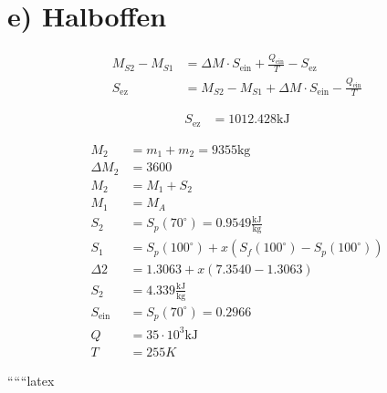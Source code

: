 \section*{e) Halboffen}

\begin{align*}
    M_{S2} - M_{S1} &= \Delta M \cdot S_{\text{ein}} + \frac{Q_{\text{ein}}}{T} - S_{\text{ez}} \\
    S_{\text{ez}} &= M_{S2} - M_{S1} + \Delta M \cdot S_{\text{ein}} - \frac{Q_{\text{ein}}}{T}
\end{align*}

\begin{align*}
    S_{\text{ez}} &= 1012.428 \text{kJ}
\end{align*}

\begin{align*}
    M_2 &= m_1 + m_2 = 9355 \text{kg} \\
    \Delta M_2 &= 3600 \\
    M_2 &= M_1 + S_2 \\
    M_1 &= M_A \\
    S_2 &= S_p(70^\circ) = 0.9549 \frac{\text{kJ}}{\text{kg}} \\
    S_1 &= S_p(100^\circ) + x \left( S_f(100^\circ) - S_p(100^\circ) \right) \\
    \Delta 2 &= 1.3063 + x \left( 7.3540 - 1.3063 \right) \\
    S_2 &= 4.339 \frac{\text{kJ}}{\text{kg}} \\
    S_{\text{ein}} &= S_p(70^\circ) = 0.2966 \\
    Q &= 35 \cdot 10^3 \text{kJ} \\
    T &= 255 K
\end{align*}

``````latex